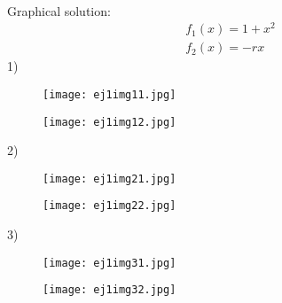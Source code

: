\documentclass[a4paper,10pt]{article}
\begin{document}
\begin{enumerate}
\begin{enumerate}
\begin{equation}
\begin{aligned}
                    \end{aligned}
                \end{equation}
               Graphical solution:
               \begin{equation}
                   \begin{aligned}
                       f_{1}(x)= 1+ x^{2}\\
                       f_{2}(x)= -rx
                   \end{aligned}
               \end{equation}
                1)
                \begin{figure}[h]
                    \centering
                    \texttt{[image: ej1img11.jpg]}
                    
                    \label{fig:mesh1}
                \end{figure}
                \newpage
                \begin{figure}[h]
                    \centering
                    \texttt{[image: ej1img12.jpg]}
                    
                    \label{fig:mesh1}
                \end{figure}
                2)
                \begin{figure}[h]
                    \centering
                    \texttt{[image: ej1img21.jpg]}
                    
                    \label{fig:mesh1}
                \end{figure}
                \newpage
                \begin{figure}[h]
                    \centering
                    \texttt{[image: ej1img22.jpg]}
                    
                    \label{fig:mesh1}
                \end{figure}
                3)
                \begin{figure}[h]
                    \centering
                    \texttt{[image: ej1img31.jpg]}
                    
                    \label{fig:mesh1}
                \end{figure}
                \newpage
                \begin{figure}[h]
                    \centering
                    \texttt{[image: ej1img32.jpg]}
                    

\end{figure}
\end{enumerate}
\end{enumerate}
\end{document}
